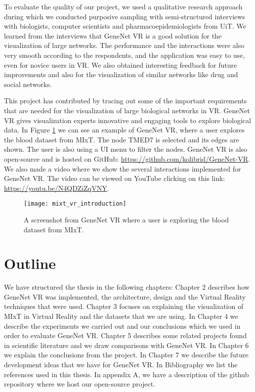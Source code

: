 To evaluate the quality of our project, we used a qualitative research approach during which we conducted purposive sampling with semi-structured interviews with biologists, computer scientists and pharmacoepidemiologists from UiT. We learned from the interviews that GeneNet VR is a good solution for the visualization of large networks. The performance and the interactions were also very smooth according to the respondents, and the application was easy to use, even for novice users in VR. We also obtained interesting feedback for future improvements and also for the visualization of similar networks like drug and social networks.

This project has contributed by tracing out some of the important requirements that are needed for the visualization of large biological networks in VR. GeneNet VR gives visualization experts innovative and engaging tools to explore biological data. In Figure \ref{fig:bignet_intro} we can see an example of GeneNet VR, where a user explores the blood dataset from MIxT. The node TMED7 is selected and its edges are shown. The user is also using a UI menu to filter the nodes. GeneNet VR is also open-source and is hosted on GitHub: \url{https://github.com/kolibrid/GeneNet-VR}. We also made a video where we show the several interactions implemented for GeneNet VR. The video can be viewed on YouTube clicking on this link: \url{https://youtu.be/N4QDZiZqVNY}.

\begin{figure}[h!]
    \newlength{\tempheight}
    \setlength{\tempheight}{15ex}
    \centering
    \texttt{[image: mixt\_vr\_introduction]}
    \caption{A screenshot from GeneNet VR where a user is exploring the blood dataset from MIxT.}
    \label{fig:bignet_intro}
\end{figure}


\section{Outline}

We have structured the thesis in the following chapters: Chapter 2 describes how GeneNet VR was implemented, the architecture, design and the Virtual Reality techniques that were used. Chapter 3 focuses on explaining the visualization of MIxT in Virtual Reality and the datasets that we are using. In Chapter 4 we describe the experiments we carried out and our conclusions which we used in order to evaluate GeneNet VR. Chapter 5 describes some related projects found in scientific literature and we draw comparisons with GeneNet VR. In Chapter 6 we explain the conclusions from the project. In Chapter 7 we describe the future development ideas that we have for GeneNet VR. In Bibliography we list the references used in this thesis. In appendix A, we have a description of the github repository where we host our open-source project.
